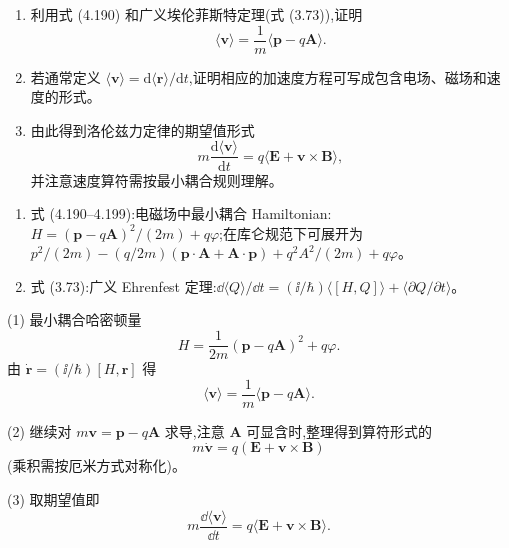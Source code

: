 \begin{question}
\begin{enumerate}
\item 利用式 (4.190) 和广义埃伦菲斯特定理(式 (3.73)),证明
\[
\langle\mathbf v\rangle=\frac1m\langle \mathbf p-q\mathbf A\rangle.
\]
\item 若通常定义 $\langle\mathbf v\rangle=\mathrm d\langle\mathbf r\rangle/\mathrm dt$,证明相应的加速度方程可写成包含电场、磁场和速度的形式。
\item 由此得到洛伦兹力定律的期望值形式
\[
m\frac{\mathrm d\langle\mathbf v\rangle}{\mathrm dt}=q\langle\mathbf E+\mathbf v\times\mathbf B\rangle,
\]
并注意速度算符需按最小耦合规则理解。
\end{enumerate}

\par\smallskip
{}
\begin{enumerate}[leftmargin=2.2em,itemsep=0.12em,topsep=0.12em,parsep=0pt]
\item 式 (4.190--4.199):电磁场中最小耦合 Hamiltonian:$H=(\mathbf p-q\mathbf A)^2/(2m)+q\varphi$;在库仑规范下可展开为 $p^2/(2m)-(q/2m)(\mathbf p\cdot\mathbf A+\mathbf A\cdot\mathbf p)+q^2A^2/(2m)+q\varphi$。
\item 式 (3.73):广义 Ehrenfest 定理:$\dd\langle Q\rangle/\dd t=(\ii/\hbar)\langle[H,Q]\rangle+\langle\partial Q/\partial t\rangle$。
\end{enumerate}

\end{question}
\begin{solution}

(1) 最小耦合哈密顿量
\[
H=\frac{1}{2m}(\mathbf p-q\mathbf A)^2+q\varphi.
\]
由 $\dot{\mathbf r}=(\ii/\hbar)[H,\mathbf r]$ 得
\[
\langle\mathbf v\rangle=\frac{1}{m}\langle\mathbf p-q\mathbf A\rangle.
\]

(2) 继续对 $m\mathbf v=\mathbf p-q\mathbf A$ 求导,注意 $\mathbf A$ 可显含时,整理得到算符形式的
\[
m\dot{\mathbf v}=q(\mathbf E+\mathbf v\times\mathbf B)
\]
(乘积需按厄米方式对称化)。

(3) 取期望值即
\[
m\frac{\dd\langle\mathbf v\rangle}{\dd t}=q\langle\mathbf E+\mathbf v\times\mathbf B\rangle.
\]

\end{solution}

